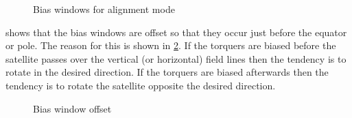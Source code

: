 \begin{figure}[H]
    \centering
    
    \caption{Bias windows for alignment mode}
    \label{fig:windows}
\end{figure}

 shows that the bias windows are offset so that they occur just before the equator or pole. The reason for this is shown in \cref{fig:winplace}. If the torquers are biased before the satellite passes over the vertical (or horizontal) field lines then the tendency is to rotate in the desired direction. If the torquers are biased afterwards then the tendency is to rotate the satellite opposite the desired direction\cite{Mentch11}.

\begin{figure}[htb!]
    \centering
    
    \caption{Bias window offset}
    \label{fig:winplace}
\end{figure}

